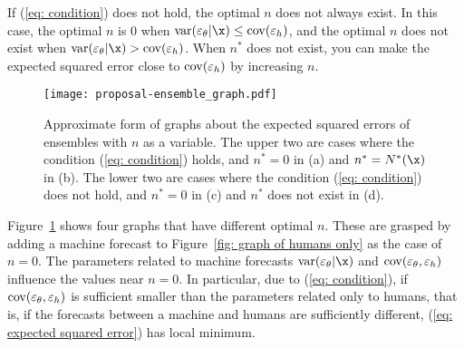 \documentclass[../main.tex]{subfiles}
\begin{document}
If (\ref{eq: condition}) does not hold, the optimal $n$ does not always exist.
In this case, the optimal $n$ is $0$ when $\varm \leq \covh$, and the optimal $n$ does not exist when $\varm > \covh$.
When $n^\ast$ does not exist, you can make the expected squared error close to $\operatorname{cov}(\varepsilon_h)$ by increasing $n$.

\begin{figure}
  \centering
  \texttt{[image: proposal-ensemble\_graph.pdf]}
  \caption{
    Approximate form of graphs about the expected squared errors of ensembles with $n$ as a variable.
    The upper two are cases where the condition (\ref{eq: condition}) holds, and $n^\ast = 0$ in (a) and $n^\ast = N^\ast(\x)$ in (b).
    The lower two are cases where the condition (\ref{eq: condition}) does not hold, and $n^\ast = 0$ in (c) and $n^\ast$ does not exist in (d).
  }\label{fig: graph of ensemble}
\end{figure}

Figure~\ref{fig: graph of ensemble} shows four graphs that have different optimal $n$.
These are grasped by adding a machine forecast to Figure~\ref{fig: graph of humans only} as the case of $n=0$.
The parameters related to machine forecasts $\varm$ and $\operatorname{cov}(\varepsilon_\theta, \varepsilon_h)$ influence the values near $n = 0$.
In particular, due to (\ref{eq: condition}), if $\operatorname{cov}(\varepsilon_\theta, \varepsilon_h)$ is sufficient smaller than the parameters related only to humans, that is, if the forecasts between a machine and humans are sufficiently different, (\ref{eq: expected squared error}) has local minimum.
\end{document}
